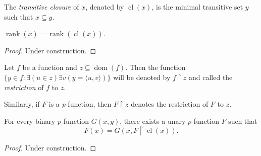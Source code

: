 \begin{definition}
    \label{def:cl}
    The \textit{transitive closure} of $x$, denoted by $\operatorname{cl}(x)$, is the minimal 
    transitive set $y$ such that $x \subseteq y$.
\end{definition}

\begin{theorem}
    \label{thm:rank_eq_rank_cl}
    $\operatorname{rank}(x) = \operatorname{rank}(\operatorname{cl}(x))$.
\end{theorem}

\begin{proof}
    Under construction.
\end{proof}

\begin{definition}[Restriction]
    \label{def:IsFunc.restr+pFunc.restr}
    Let $f$ be a function and $z \subseteq \operatorname{dom}(f)$.
    Then the function $\{y \in f : \exists (u \in z) \exists v (y = \langle u,v \rangle)\}$
    will be denoted by $f \upharpoonright z$ and called the \textit{restriction} of $f$ to $z$.

    Similarly, if $F$ is a \textit{p}-function, then $F \upharpoonright z$ denotes the 
    restriction of $F$ to $z$.
\end{definition}

\begin{theorem}
    \label{thm:rank.exists_pFuncRecursive}
    For every binary $p$-function $G(x,y)$, there exists a unary $p$-function $F$ such that
    $$
    F(x) = G(x, F \upharpoonright \operatorname{cl}(x)).
    $$
\end{theorem}

\begin{proof}
    Under construction.
\end{proof}

